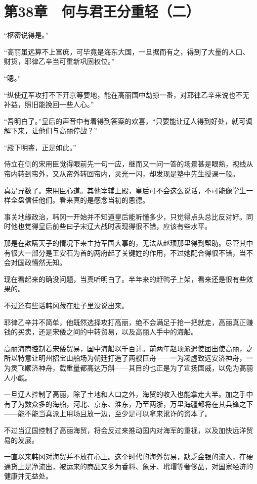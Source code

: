 \section{第38章　何与君王分重轻（二）}

“枢密说得是。”

“高丽虽远算不上富庶，可毕竟是海东大国，一旦据而有之，得到了大量的人口、财货，耶律乙辛当可重新巩固权位。”

“嗯。”

“纵使辽军攻打不下开京等要地，能在高丽国中劫掠一番，对耶律乙辛来说也不无补益，照旧能挽回一些人心。”

“吾明白了。”皇后的声音中有着得到答案的欢喜，“只要能让辽人得到好处，就可调解下来，让他们与高丽停战？”

“殿下明睿，正是如此。”

侍立在侧的宋用臣觉得眼前先一句一应，继而又一问一答的场景甚是眼熟，视线从帘内转到帘外，又从帘外转回帘内，灵光一闪，却发现是塾中先生授课一般。

真是异数了。宋用臣心道。其他宰辅上殿，皇后可不会这么说话，不可能像学生一样全盘信任他们。看来真的是感念当初的恩德。

事关地缘政治，韩冈一开始并不知道皇后能听懂多少，只觉得点头总比反对好。同时他也觉得皇后前些曰子宋辽大战时表现得很不错，应该有些水平。

那是在欺瞒天子的情况下来主持军国大事的，无法从赵顼那里得到帮助。尽管其中有很大一部分是王安石为首的两府起了关键姓的作用，不过她配合得很不错，当不会对国政懵然无知。

现在看起来的确没问题，当真听明白了。半年来的赶鸭子上架，看来还是很有些效果的。

不过还有些话韩冈藏在肚子里没说出来。

耶律乙辛并不简单，他既然选择攻打高丽，绝不会满足于抢一把就走，高丽真正赚钱的买卖，还是宋倭之间的中转贸易，以及高丽人手中的海船。

高丽海商控制着宋倭贸易，国中海船以千百计。前两年赵顼派遣使团出使高丽，之所以特意让明州招宝山船场为朝廷打造了两艘巨舟——一为凌虚致远安济神舟，一为灵飞顺济神舟，载重量都高达万斛——其目的也正是为了宣扬国威，以免为高丽人小觑。

一旦辽人控制了高丽，除了土地和人口之外，海贸的收入也能拿走大半。加之手中有了为数众多的海船，河北、京东、淮东，乃至两浙，万里海疆都将在其兵锋之下——能不能当真派上用场且放一边，至少是可以拿来讹诈的资本了。

不过当辽国控制了高丽海贸，将会反过来推动国内对海军的重视，以及加快远洋贸易的发展。

一直以来韩冈对海贸并不放在心上。这个时代的海外贸易，缺乏金银的流入，在硬通货上是净流出，被运来的商品又多为香料、象牙、玳瑁等奢侈品，对国家经济的健康并无益处。

